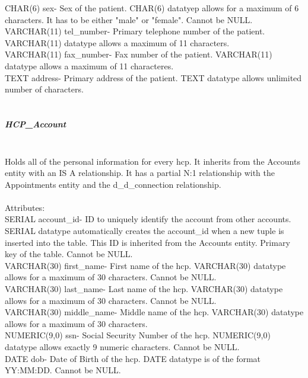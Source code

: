 \documentclass[12pt]{report}
\begin{document}
CHAR(6) sex- Sex of the patient. CHAR(6) datatyep allows for a maximum of 6 characters.  It has to be either "male" or "female".  Cannot be NULL.\\

VARCHAR(11) tel_number- Primary telephone number of the patient.  VARCHAR(11) datatype allows a maximum of 11 characters.\\

VARCHAR(11) fax_number- Fax number of the patient.  VARCHAR(11) datatype allows a maximum of 11 characteres.\\

TEXT address- Primary address of the patient.  TEXT datatype allows unlimited number of characters.\\ \\

\subparagraph{HCP_Account}\\
Holds all of the personal information for every hcp.  It inherits from the Accounts entity with an IS A relationship.  It has a partial N:1 relationship with the Appointments entity and the d_d_connection relationship.\\ \\

Attributes:\\
SERIAL account_id- ID to uniquely identify the account from other accounts. SERIAL datatype automatically creates the account_id when a new tuple is inserted into the table.  This ID is inherited from the Accounts entity. Primary key of the table.  Cannot be NULL.\\

VARCHAR(30) first_name-  First name of the hcp.  VARCHAR(30) datatype allows for a maximum of 30 characters.  Cannot be NULL.\\

VARCHAR(30) last_name- Last name of the hcp.  VARCHAR(30) datatype allows for a maximum of 30 characters.  Cannot be NULL.\\ 

VARCHAR(30) middle_name- Middle name of the hcp. VARCHAR(30) datatype allows for a maximum of 30 characters.\\

NUMERIC(9,0) ssn- Social Security Number of the hcp. NUMERIC(9,0) datatype allows exactly 9 numeric characters.  Cannot be NULL.\\

DATE dob- Date of Birth of the hcp.  DATE datatype is of the format YY:MM:DD.  Cannot be NULL.\\
\end{document}
